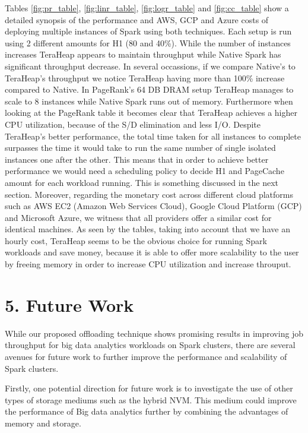 \documentclass[twocolumn,10pt]{asme2e}
\begin{document}
Tables \ref{fig:pr_table}, \ref{fig:linr_table}, \ref{fig:logr_table} and \ref{fig:cc_table} show a detailed synopsis of the performance and AWS, GCP and Azure costs of deploying multiple instances of Spark using both techniques. Each setup is run using 2 different amounts for H1 (80 and 40\%). While the number of instances increases TeraHeap appears to maintain throughput while Native Spark has significant throughput decrease. In several occassions, if we compare Native's to TeraHeap's throughput we notice TeraHeap having more than 100\% increase compared to Native. In PageRank's 64 DB DRAM setup TeraHeap manages to scale to 8 instances while Native Spark runs out of memory. Furthermore when looking at the PageRank table it becomes clear that TeraHeap achieves a higher CPU utilization, because of the S/D elimination and less I/O. Despite TeraHeap's better performance, the total time taken for all instances to complete surpasses the time it would take to run the same number of single isolated instances one after the other. This means that in order to achieve better performance we would need a scheduling policy to decide H1 and PageCache amount for each workload running. This is something discussed in the next section.
Moreover, regarding the monetary cost across different cloud platforms such as AWS EC2 (Amazon Web Services Cloud), Google Cloud Platform (GCP) and Microsoft Azure, we witness that all providers offer a similar cost for identical machines. As seen by the tables, taking into account that we have an hourly cost, TeraHeap seems to be the obvious choice for running Spark workloads and save money, because it is able to offer more scalability to the user by freeing memory in order to increase CPU utilization and increase throuput. 
\section*{5. Future Work}

While our proposed offloading technique shows promising results in improving job throughput for big data analytics workloads on Spark clusters, there are several avenues for future work to further improve the performance and scalability of Spark clusters. 

Firstly, one potential direction for future work is to investigate the use of other types of storage mediums such as the hybrid NVM. This medium could improve the performance of Big data analytics further by combining the advantages of memory and storage.
\end{document}
